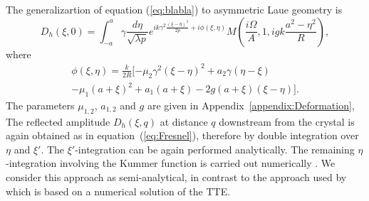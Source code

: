 \documentclass[preprint]{iucr}              %
\newcommand{\inred}[1]{{\color{red}#1}}
\begin{document}
 \inred{The generalizartion of equation (\ref{eq:blabla}) to asymmetric Laue geometry is \cite{GuigayFerrero2016}}
\begin{equation}
\label{eq:unpropagatedkummer}
    D_h(\xi,0) = 
    \int_{-a}^{a} \gamma\frac{d\eta}{\sqrt{\lambda p}}
    e^{i k \gamma^2
    \frac{(\xi-\eta)^2}{2p}+i \phi(\xi,\eta)
    }
     M(\frac{i\Omega}{A},1,i g k \frac{a^2-\eta^2}{R}),
\end{equation}
where 
\begin{multline}
    \phi(\xi,\eta) =\frac{k}{2R}[-\mu_2\gamma^2(\xi-\eta)^2
    +a_2\gamma(\eta-\xi) \\
    -\mu_1(a+\xi)^2 
    +a_1(a+\xi)
    -2g(a+\xi)(\xi-\eta)].
\end{multline}
The parameters $\mu_{1,2}$, $a_{1,2}$ \inred{and $g$} are given in Appendix~\ref{appendix:Deformation},
The reflected amplitude $D_h(\xi,q)$ at distance $q$ downstream \inred{from} the crystal is again obtained \inred{as in} equation~(\ref{eq:Fresnel}), therefore by double integration over $\eta$ and $\xi'$. The $\xi'$-integration can be again performed analytically. The remaining $\eta$-integration involving the Kummer function is carried out numerically \cite{GuigayFerrero2016}. We consider this approach as semi-analytical, in contrast to the approach used by \cite{Nesterets} which is based on a numerical solution of the TTE.
\end{document}
